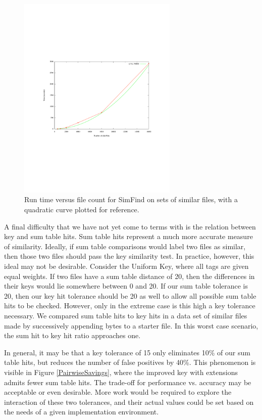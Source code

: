 \documentclass[10pt, twocolumn]{article}
\begin{document}
 \begin{figure}[t] 
 \centering
\includegraphics[width= 3in]{performance.pdf}
\caption{Run time versus file count for SimFind on sets of similar files, with a quadratic curve plotted for reference.}
\label{performanceTest}
\end{figure}

A final difficulty that we have not yet come to terms with is the relation between key and sum table hits.  Sum table hits represent a much more accurate measure of similarity.  Ideally, if sum table comparisons would label two files as similar, then those two files should pass the key similarity test.  In practice, however, this ideal may not be desirable.  Consider the Uniform Key, where all tags are given equal weights.  If two files have a sum table distance of 20, then the differences in their keys would lie somewhere between 0 and 20. If our sum table tolerance is 20, then our key hit tolerance should be 20 as well to allow all possible sum table hits to be checked.  However, only in the extreme case is this high a key tolerance necessary. We compared sum table hits to key hits in a data set of similar files made by successively appending bytes to a starter file. In this worst case scenario, the sum hit to key hit ratio approaches one. 

In general, it may be that a key tolerance of 15 only eliminates 10\% of our sum table hits, but reduces the number of false positives by 40\%.  This phenomenon is visible in Figure \ref{PairwiseSavings}, where the improved key with extensions admits fewer sum table hits.  The trade-off for performance vs. accuracy may be acceptable or even desirable.  More work would be required to explore the interaction of these two tolerances, and their actual values could be set based on the needs of a given implementation environment.
\end{document}
